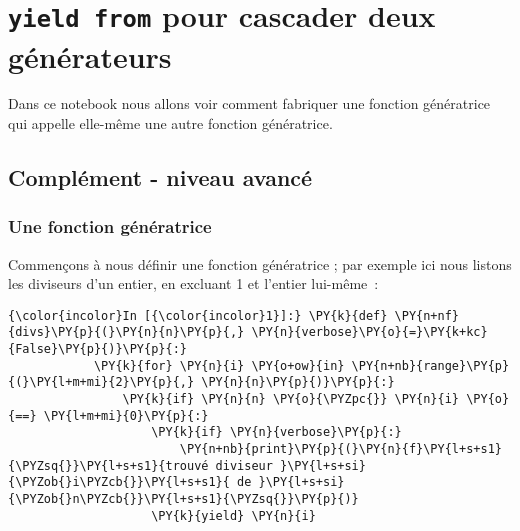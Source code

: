     
    
    
    

    

    \hypertarget{yield-from-pour-cascader-deux-guxe9nuxe9rateurs}{%
\section{\texorpdfstring{\texttt{yield\ from} pour cascader deux
générateurs}{yield from pour cascader deux générateurs}}\label{yield-from-pour-cascader-deux-guxe9nuxe9rateurs}}

    Dans ce notebook nous allons voir comment fabriquer une fonction
génératrice qui appelle elle-même une autre fonction génératrice.

    \hypertarget{compluxe9ment---niveau-avancuxe9}{%
\subsection{Complément - niveau
avancé}\label{compluxe9ment---niveau-avancuxe9}}

    \hypertarget{une-fonction-guxe9nuxe9ratrice}{%
\subsubsection{Une fonction
génératrice}\label{une-fonction-guxe9nuxe9ratrice}}

    Commençons à nous définir une fonction génératrice ; par exemple ici
nous listons les diviseurs d'un entier, en excluant 1 et l'entier
lui-même~:

    \begin{Verbatim}[commandchars=\\\{\},frame=single,framerule=0.3mm,rulecolor=\color{cellframecolor}]
{\color{incolor}In [{\color{incolor}1}]:} \PY{k}{def} \PY{n+nf}{divs}\PY{p}{(}\PY{n}{n}\PY{p}{,} \PY{n}{verbose}\PY{o}{=}\PY{k+kc}{False}\PY{p}{)}\PY{p}{:}
            \PY{k}{for} \PY{n}{i} \PY{o+ow}{in} \PY{n+nb}{range}\PY{p}{(}\PY{l+m+mi}{2}\PY{p}{,} \PY{n}{n}\PY{p}{)}\PY{p}{:}
                \PY{k}{if} \PY{n}{n} \PY{o}{\PYZpc{}} \PY{n}{i} \PY{o}{==} \PY{l+m+mi}{0}\PY{p}{:}
                    \PY{k}{if} \PY{n}{verbose}\PY{p}{:} 
                        \PY{n+nb}{print}\PY{p}{(}\PY{n}{f}\PY{l+s+s1}{\PYZsq{}}\PY{l+s+s1}{trouvé diviseur }\PY{l+s+si}{\PYZob{}i\PYZcb{}}\PY{l+s+s1}{ de }\PY{l+s+si}{\PYZob{}n\PYZcb{}}\PY{l+s+s1}{\PYZsq{}}\PY{p}{)}
                    \PY{k}{yield} \PY{n}{i}
\end{Verbatim}


